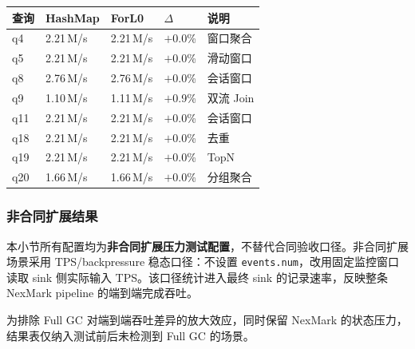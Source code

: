 \documentclass[a4paper,11pt]{article}
\begin{document}
\begin{table}[H]
\centering
\small
\begin{tabularx}{\textwidth}{L{1.2cm} R{2.2cm} R{2.2cm} R{1.5cm} X}
\toprule
\textbf{查询} & \textbf{HashMap} & \textbf{ForL0} & $\Delta$ & \textbf{说明} \\
\midrule
q4  & 2.21\,M/s & 2.21\,M/s & $+$0.0\% & 窗口聚合 \\
q5  & 2.21\,M/s & 2.21\,M/s & $+$0.0\% & 滑动窗口 \\
q8  & 2.76\,M/s & 2.76\,M/s & $+$0.0\% & 会话窗口 \\
q9  & 1.10\,M/s & 1.11\,M/s & $+$0.9\% & 双流 Join \\
q11 & 2.21\,M/s & 2.21\,M/s & $+$0.0\% & 会话窗口 \\
q18 & 2.21\,M/s & 2.21\,M/s & $+$0.0\% & 去重 \\
q19 & 2.21\,M/s & 2.21\,M/s & $+$0.0\% & TopN \\
q20 & 1.66\,M/s & 1.66\,M/s & $+$0.0\% & 分组聚合 \\
\bottomrule
\end{tabularx}
\end{table}

\subsubsection{非合同扩展结果}

本小节所有配置均为\textbf{非合同扩展压力测试配置}，不替代合同验收口径。非合同扩展场景采用 TPS/backpressure 稳态口径：不设置 \texttt{events.num}，改用固定监控窗口读取 sink 侧实际输入 TPS。该口径统计进入最终 sink 的记录速率，反映整条 NexMark pipeline 的端到端完成吞吐。

为排除 Full GC 对端到端吞吐差异的放大效应，同时保留 NexMark 的状态压力，结果表仅纳入测试前后未检测到 Full GC 的场景。
\end{document}
